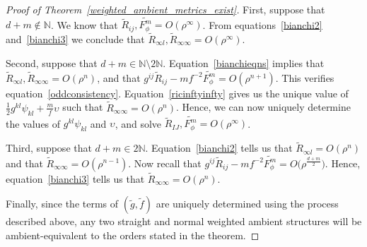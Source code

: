 \begin{proof}[Proof of Theorem~\ref{weighted_ambient_metrics_exist}]
First, suppose that $d+m\notin\mathbb{N}$. We know that $\widetilde{R}_{ij},\widetilde{F_\phi^m}=O(\rho^\infty)$. From equations~\eqref{bianchi2} and~\eqref{bianchi3} we conclude that $\widetilde{R}_{\infty l},\widetilde{R}_{\infty\infty}=O(\rho^\infty)$.

Second, suppose that $d+m\in \mathbb{N}\setminus 2\mathbb{N}$. Equation~\eqref{bianchieqns} implies that $\widetilde{R}_{\infty l},\widetilde{R}_{\infty\infty}=O(\rho^{n})$, and that $g^{ij}\widetilde{R}_{ij}-mf^{-2}\widetilde{F_\phi^m}=O(\rho^{n+1})$. This verifies equation~\eqref{oddconsistency}. Equation~\eqref{ricinftyinfty} gives us the unique value of $\frac{1}{2}g^{kl}\psi_{kl}+\frac{m}{f}\upsilon$ such that $\widetilde{R}_{\infty\infty}=O(\rho^{n})$. Hence, we can now uniquely determine the values of $g^{kl}\psi_{kl}$ and $\upsilon$, and solve $\widetilde{R}_{IJ},\widetilde{F_\phi^m}=O(\rho^\infty)$.

Third, suppose that $d+m\in 2\mathbb{N}$. Equation~\eqref{bianchi2} tells us that $\widetilde{R}_{\infty l}=O(\rho^n)$ and that $\widetilde{R}_{\infty\infty}=O(\rho^{n-1})$. Now recall that $g^{ij}\widetilde{R}_{ij}-mf^{-2}\widetilde{F_\phi^m}=O\big(\rho^{\frac{d+m}{2}}\big)$.
Hence, equation~\eqref{bianchi3} tells us that $\widetilde{R}_{\infty\infty}=O(\rho^n)$.

Finally, since the terms of $(\widetilde{g},\widetilde{f})$ are uniquely determined using the process described above, any two straight and normal weighted ambient structures will be ambient-equivalent to the orders stated in the theorem.
\end{proof}
